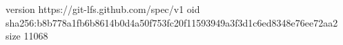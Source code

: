 version https://git-lfs.github.com/spec/v1
oid sha256:b8b778a1fb6b8614b0d4a50f753fc20f11593949a3f3d1c6ed8348e76ee72aa2
size 11068
